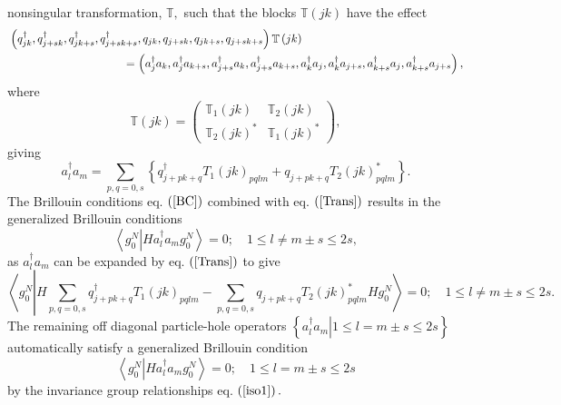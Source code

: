 \documentclass{preprint}
\begin{document}
nonsingular transformation, $\mathbb{T},$ such that the blocks $\mathbb{T}%
\left( jk\right) $ have the effect
\begin{align}
& \left( q_{jk}^{\dagger },q_{j+sk}^{\dagger },q_{jk+s}^{\dagger
},q_{j+sk+s}^{\dagger },q_{jk},q_{j+sk},q_{jk+s},q_{j+sk+s}\right) \mathbb{T}%
\left( jk\right)  \notag \\
& \qquad \qquad \qquad \qquad \qquad \left. =\right. \left( a_{j}^{\dagger
}a_{k},a_{j}^{\dagger }a_{k+s},a_{j+s}^{\dagger }a_{k},a_{j+s}^{\dagger
}a_{k+s},a_{k}^{\dagger }a_{j},a_{k}^{\dagger }a_{j+s},a_{k+s}^{\dagger
}a_{j},a_{k+s}^{\dagger }a_{j+s}\right) ,
\end{align}%
where
\begin{equation}
\mathbb{T}\left( jk\right) =\left(
\begin{array}{cc}
\mathbb{T}_{1}\left( jk\right) & \mathbb{T}_{2}\left( jk\right) \\
\mathbb{T}_{2}\left( jk\right) ^{\ast } & \mathbb{T}_{1}\left( jk\right)
^{\ast }%
\end{array}%
\right) ,
\end{equation}%
giving
\begin{equation}
a_{l}^{\dagger }a_{m}=\sum_{p,q=0,s}\left\{ q_{j+pk+q}^{\dagger }T_{1}\left(
jk\right) _{pqlm}+q_{j+pk+q}T_{2}\left( jk\right) _{pqlm}^{\ast }\right\} .
\label{Trans}
\end{equation}%
The Brillouin conditions eq. $\left( \ref{BC}\right) $ combined with eq. $%
\left( \ref{Trans}\right) $ results in the generalized Brillouin conditions
\begin{equation}
\left\langle g_{0}^{N}\left\vert Ha_{l}^{\dagger }a_{m}\right.
g_{0}^{N}\right\rangle =0;\quad 1\leq l\neq m\pm s\leq 2s,  \label{GBC}
\end{equation}%
as $a_{l}^{\dagger }a_{m}$ can be expanded by eq. $\left( \ref{Trans}\right)
$ to give%
\begin{equation}
\left\langle g_{0}^{N}\left\vert H\sum_{p,q=0,s}q_{j+pk+q}^{\dagger
}T_{1}\left( jk\right) _{pqlm}-\sum_{p,q=0,s}q_{j+pk+q}T_{2}\left( jk\right)
_{pqlm}^{\ast }Hg_{0}^{N}\right. \right\rangle =0;\quad 1\leq l\neq m\pm
s\leq 2s.
\end{equation}%
The remaining off diagonal particle-hole operators $\left\{ \left.
a_{l}^{\dagger }a_{m}\right\vert 1\leq l=m\pm s\leq 2s\right\} $
automatically satisfy a generalized Brillouin condition
\begin{equation}
\left\langle g_{0}^{N}\left\vert Ha_{l}^{\dagger }a_{m}g_{0}^{N}\right.
\right\rangle =0;\quad 1\leq l=m\pm s\leq 2s  \label{ph}
\end{equation}%
by the invariance group relationships eq. $\left( \ref{iso1}\right) .$
\end{document}
